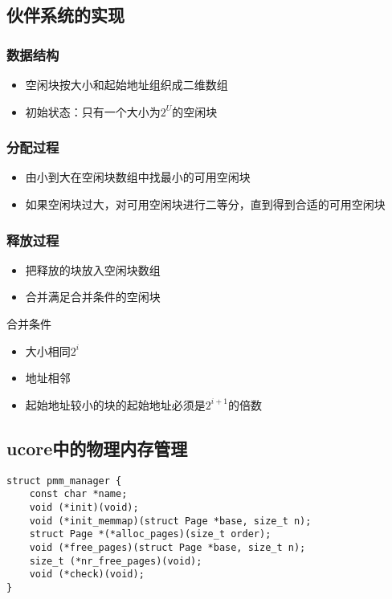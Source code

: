 \subsection{伙伴系统的实现}
\subsubsection{数据结构}
\begin{itemize}
	\item 空闲块按大小和起始地址组织成二维数组
	\item 初始状态：只有一个大小为$2^U$的空闲块
\end{itemize}
\subsubsection{分配过程}
\begin{itemize}
	\item 由小到大在空闲块数组中找最小的可用空闲块
	\item 如果空闲块过大，对可用空闲块进行二等分，直到得到合适的可用空闲块
\end{itemize}
\subsubsection{释放过程}
\begin{itemize}
	\item 把释放的块放入空闲块数组
	\item 合并满足合并条件的空闲块
\end{itemize}
合并条件
\begin{itemize}
	\item 大小相同$2^i$
	\item 地址相邻
	\item 起始地址较小的块的起始地址必须是$2^{i+1}$的倍数
\end{itemize}
\subsection{ucore中的物理内存管理}
\begin{lstlisting}
struct pmm_manager {
	const char *name;
	void (*init)(void);
	void (*init_memmap)(struct Page *base, size_t n);
	struct Page *(*alloc_pages)(size_t order);
	void (*free_pages)(struct Page *base, size_t n);
	size_t (*nr_free_pages)(void);
	void (*check)(void);
}
\end{lstlisting}
